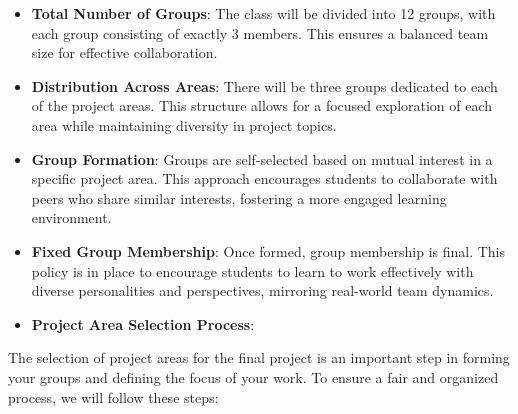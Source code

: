 \documentclass[
  letterpaper,
  DIV=11,
  numbers=noendperiod]{scrartcl}
\begin{document}
\begin{itemize}
\item
  \textbf{Total Number of Groups}: The class will be divided into 12
  groups, with each group consisting of exactly 3 members. This ensures
  a balanced team size for effective collaboration.
\item
  \textbf{Distribution Across Areas}: There will be three groups
  dedicated to each of the project areas. This structure allows for a
  focused exploration of each area while maintaining diversity in
  project topics.
\item
  \textbf{Group Formation}: Groups are self-selected based on mutual
  interest in a specific project area. This approach encourages students
  to collaborate with peers who share similar interests, fostering a
  more engaged learning environment.
\item
  \textbf{Fixed Group Membership}: Once formed, group membership is
  final. This policy is in place to encourage students to learn to work
  effectively with diverse personalities and perspectives, mirroring
  real-world team dynamics.
\item
  \textbf{Project Area Selection Process}:
\end{itemize}

The selection of project areas for the final project is an important
step in forming your groups and defining the focus of your work. To
ensure a fair and organized process, we will follow these steps:
\end{document}
